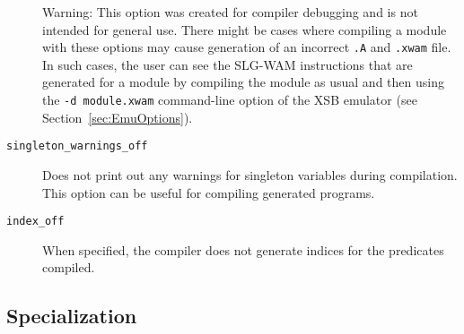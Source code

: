 \begin{description}
	{\sc Warning:} This option was created for compiler debugging and is
		not intended for general use.  There might be cases where
		compiling a module with these options may cause generation
		of an incorrect {\tt .A} and {\tt .xwam} file.  In such cases,
		the user can see the SLG-WAM instructions that are
		generated for a module by compiling the module as usual and
		then using the {\tt -d module.xwam} command-line
		option of the 
		XSB emulator (see Section~\ref{sec:EmuOptions}).
\item[{\tt singleton\_warnings\_off}] Does not print out any warnings
	for singleton variables during compilation.  This option can
	be useful for compiling generated programs.
\item[{\tt index\_off}] When specified, the compiler does not generate indices
	for the predicates compiled.  
\end{description}


\subsection{Specialization}\label{specialization}


